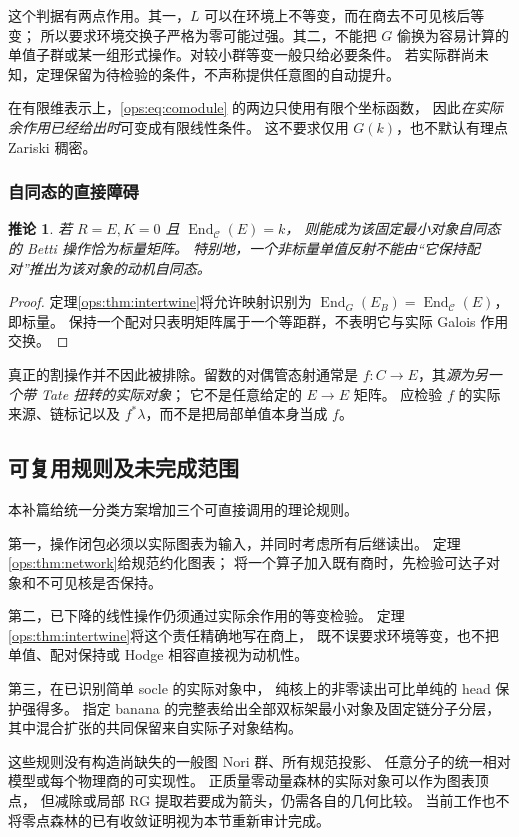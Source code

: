 \documentclass[11pt,a4paper,oneside]{ctexart}
\theoremstyle{cnplain}
\newtheorem{corollary}[theorem]{推论}
\theoremstyle{definition}
\theoremstyle{remark}
\newcommand{\End}{\operatorname{End}}
\numberwithin{equation}{section}
\begin{document}
这个判据有两点作用。其一，$L$ 可以在环境上不等变，而在商去不可见核后等变；
所以要求环境交换子严格为零可能过强。其二，不能把 $G$ 偷换为容易计算的
单值子群或某一组形式操作。对较小群等变一般只给必要条件。
若实际群尚未知，定理保留为待检验的条件，不声称提供任意图的自动提升。

在有限维表示上，\eqref{ops:eq:comodule} 的两边只使用有限个坐标函数，
因此\emph{在实际余作用已经给出时}可变成有限线性条件。
这不要求仅用 $G(k)$，也不默认有理点 Zariski 稠密。

\subsubsection{自同态的直接障碍}
\begin{corollary}\label{ops:cor:scalar}
若 $R=E,K=0$ 且 $\End_{\mathcal C}(E)=k$，
则能成为该固定最小对象自同态的 Betti 操作恰为标量矩阵。
特别地，一个非标量单值反射不能由``它保持配对''推出为该对象的动机自同态。
\end{corollary}
\begin{proof}
定理\ref{ops:thm:intertwine}将允许映射识别为
$\End_G(E_B)=\End_{\mathcal C}(E)$，即标量。
保持一个配对只表明矩阵属于一个等距群，不表明它与实际 Galois 作用交换。
\end{proof}

真正的割操作并不因此被排除。留数的对偶管态射通常是
$f:C\to E$，其\emph{源为另一个带 Tate 扭转的实际对象}；
它不是任意给定的 $E\to E$ 矩阵。
应检验 $f$ 的实际来源、链标记以及 $f^*\lambda$，而不是把局部单值本身当成 $f$。


\subsection{可复用规则及未完成范围}
本补篇给统一分类方案增加三个可直接调用的理论规则。

第一，操作闭包必须以实际图表为输入，并同时考虑所有后继读出。
定理\ref{ops:thm:network}给规范约化图表；
将一个算子加入既有商时，先检验可达子对象和不可见核是否保持。

第二，已下降的线性操作仍须通过实际余作用的等变检验。
定理\ref{ops:thm:intertwine}将这个责任精确地写在商上，
既不误要求环境等变，也不把单值、配对保持或 Hodge 相容直接视为动机性。

第三，在已识别简单 socle 的实际对象中，
纯核上的非零读出可比单纯的 head 保护强得多。
指定 banana 的完整表给出全部双标架最小对象及固定链分子分层，
其中混合扩张的共同保留来自实际子对象结构。

这些规则没有构造尚缺失的一般图 Nori 群、所有规范投影、
任意分子的统一相对模型或每个物理商的可实现性。
正质量零动量森林的实际对象可以作为图表顶点，
但减除或局部 RG 提取若要成为箭头，仍需各自的几何比较。
当前工作也不将零点森林的已有收敛证明视为本节重新审计完成。
\end{document}
